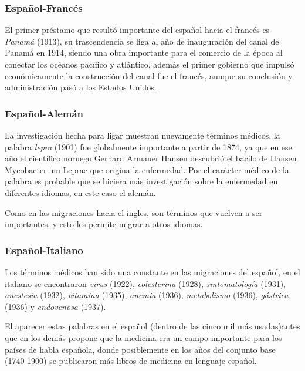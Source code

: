 \subsubsection*{Español-Francés}%

El primer préstamo que resultó importante del español hacia el francés es \textit{Panamá} (1913), su trascendencia se liga al año de inauguración del canal de Panamá en 1914, siendo una obra importante para el comercio de la época al conectar los océanos pacífico y atlántico, además el primer gobierno que impulsó económicamente la construcción del canal fue el francés,  aunque su conclusión y administración pasó a los Estados Unidos.  




\subsubsection*{Español-Alemán}%


La investigación hecha para ligar muestran nuevamente términos médicos, la palabra \textit{lepra} (1901) fue globalmente importante a partir de 1874,  ya que en ese año el científico noruego Gerhard Armauer Hansen descubrió el bacilo de Hansen Mycobacterium Leprae \cite{lepra} que origina la enfermedad. Por el carácter médico de la palabra es probable que se hiciera más investigación sobre la enfermedad en diferentes idiomas, en este caso el alemán.

Como en las migraciones hacia el ingles, son términos que vuelven a ser importantes,  y esto les permite migrar a otros idiomas. 


\subsubsection*{Español-Italiano}%

Los términos médicos han sido una constante en las migraciones del español, en el italiano se encontraron \textit{virus} (1922), \textit{colesterina} (1928),  \textit{sintomatología} (1931), \textit{anestesia} (1932), \textit{vitamina} (1935), \textit{anemia} (1936), \textit{metabolismo} (1936),  \textit{gástrica} (1936)  y \textit{endovenosa} (1937).  

El aparecer estas palabras en el español (dentro de las cinco mil más usadas)antes que en los demás propone que la medicina era un campo importante para los países de habla española, donde posiblemente en los años del conjunto base (1740-1900) se publicaron más libros de medicina en lenguaje español. 






